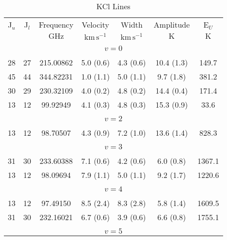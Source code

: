 \begin{table*}[htp]
\centering
\caption{KCl Lines}
\begin{tabular}{ccccccc}
\label{tab:KCl_salt_lines}
 J$_u$ & J$_l$ & Frequency & Velocity & Width & Amplitude & E$_U$ \\
  &  & $\mathrm{GHz}$ & $\mathrm{km\,s^{-1}}$ & $\mathrm{km\,s^{-1}}$ & $\mathrm{K}$ & $\mathrm{K}$ \\
\hline
&\vspace{-0.75em}\\
\multicolumn{7}{c}{$v = 0$} \\
\vspace{-0.75em}\\
 28 & 27 & 215.00862 & 5.0 (0.6) & 4.3 (0.6) & 10.4 (1.3) & 149.7 \\
 45 & 44 & 344.82231 & 1.0 (1.1) & 5.0 (1.1) & 9.7 (1.8) & 381.2 \\
 30 & 29 & 230.32109 & 4.0 (0.2) & 4.8 (0.2) & 14.4 (0.4) & 171.4 \\
 13 & 12 & 99.92949 & 4.1 (0.3) & 4.8 (0.3) & 15.3 (0.9) & 33.6 \\
&\vspace{-0.75em}\\
\multicolumn{7}{c}{$v = 2$} \\
\vspace{-0.75em}\\
 13 & 12 & 98.70507 & 4.3 (0.9) & 7.2 (1.0) & 13.6 (1.4) & 828.3 \\
&\vspace{-0.75em}\\
\multicolumn{7}{c}{$v = 3$} \\
\vspace{-0.75em}\\
 31 & 30 & 233.60388 & 7.1 (0.6) & 4.2 (0.6) & 6.0 (0.8) & 1367.1 \\
 13 & 12 & 98.09694 & 7.9 (1.1) & 5.0 (1.1) & 9.2 (1.7) & 1220.6 \\
&\vspace{-0.75em}\\
\multicolumn{7}{c}{$v = 4$} \\
\vspace{-0.75em}\\
 13 & 12 & 97.49150 & 8.5 (2.4) & 8.3 (2.8) & 5.8 (1.4) & 1609.5 \\
 31 & 30 & 232.16021 & 6.7 (0.6) & 3.9 (0.6) & 6.6 (0.8) & 1755.1 \\
&\vspace{-0.75em}\\
\multicolumn{7}{c}{$v = 5$} \\

\end{tabular}
\end{table*}
